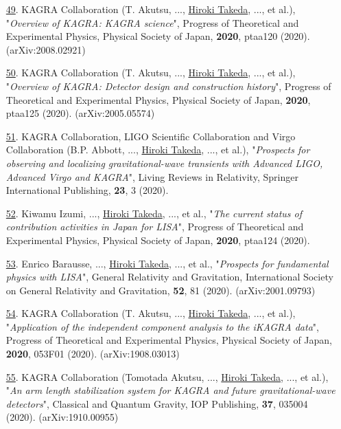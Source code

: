 \documentclass[uplatex, 12pt]{article}
\begin{document}
\begin{enumerate}
\item[\uline{49}.] KAGRA Collaboration (T. Akutsu, ..., \uline{Hiroki Takeda}, ..., et al.), "\emph{Overview of KAGRA: KAGRA science}", Progress of Theoretical and Experimental Physics, Physical Society of Japan, {\bf 2020}, ptaa120 (2020). (arXiv:2008.02921)\\

\item[\uline{50}.] KAGRA Collaboration (T. Akutsu, ..., \uline{Hiroki Takeda}, ..., et al.), "\emph{Overview of KAGRA: Detector design and construction history}", Progress of Theoretical and Experimental Physics, Physical Society of Japan, {\bf 2020}, ptaa125 (2020). (arXiv:2005.05574)\\

\item[\uline{51}.] KAGRA Collaboration, LIGO Scientific Collaboration and Virgo Collaboration (B.P. Abbott, ..., \uline{Hiroki Takeda}, ..., et al.), "\emph{Prospects for observing and localizing gravitational-wave transients with Advanced LIGO, Advanced Virgo and KAGRA}", Living Reviews in Relativity, Springer International Publishing, {\bf 23}, 3 (2020).\\

\item[\uline{52}.] Kiwamu Izumi, ..., \uline{Hiroki Takeda}, ..., et al., "\emph{The current status of contribution activities in Japan for LISA}", Progress of Theoretical and Experimental Physics, Physical Society of Japan, {\bf 2020}, ptaa124 (2020).\\

\item[\uline{53}.] Enrico Barausse, ..., \uline{Hiroki Takeda}, ..., et al., "\emph{Prospects for fundamental physics with LISA}", General Relativity and Gravitation, International Society on General Relativity and Gravitation, {\bf 52}, 81 (2020). (arXiv:2001.09793)\\

\item[\uline{54}.] KAGRA Collaboration (T. Akutsu, ..., \uline{Hiroki Takeda}, ..., et al.), "\emph{Application of the independent component analysis to the iKAGRA data}", Progress of Theoretical and Experimental Physics, Physical Society of Japan, {\bf 2020}, 053F01 (2020). (arXiv:1908.03013)\\

\item[\uline{55}.] KAGRA Collaboration (Tomotada Akutsu, ..., \uline{Hiroki Takeda}, ..., et al.), "\emph{An arm length stabilization system for KAGRA and future gravitational-wave detectors}", Classical and Quantum Gravity, IOP Publishing, {\bf 37}, 035004 (2020). (arXiv:1910.00955)\\


\end{enumerate}
\end{document}
